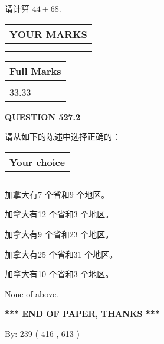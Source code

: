 \documentclass{ctexart}
\begin{document}
  
 
请计算 $ %
44 +  %
68 $.
 

 

 
  
\vspace{0.2in}
  
\noindent\begin{tabular}{|l|}
\hline
 YOUR MARKS  \\
\hline
 \\ 
 \\ 
\hline
\end{tabular}
\hspace{0.05in} \begin{tabular}{|l|}
\hline
 Full Marks  \\
\hline
 \\ 
33.33 \\
\hline
\end{tabular}
{\textbf{\Large{QUESTION
527.2 
}}}
  
  
请从如下的陈述中选择正确的：
  
  
\noindent\hspace{3.0in} \begin{tabular}{|l|}
\hline
Your choice \\
\hline
 \\ 
 \\ 
\hline
\end{tabular}
  
  
 
 
加拿大有7 个省和9 个地区。
 
 
加拿大有12 个省和3 个地区。
 
 
加拿大有9 个省和23 个地区。
 
 
加拿大有25 个省和31 个地区。
 
 
加拿大有10 个省和3 个地区。
 
 
 None of above.
 
 
   
   
 \vspace{0.2in}
 
   
   
   
   
\vspace{1.0in} 
{\textbf{\large{ *** END OF PAPER, THANKS *** }}} 
   
   
\hspace{1.0in} By: 
 239 ( 416 ,  613 )
   
\end{document}
